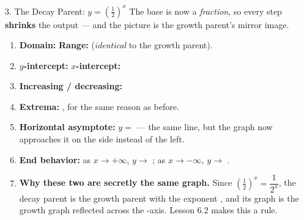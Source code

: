 \documentclass[10pt]{article}
\begin{document}
\begin{notesbox}{3. The Decay Parent: $y=\left(\frac12\right)^{x}$}
\vspace{2pt}
The base is now a \emph{fraction}, so every step \textbf{shrinks} the output --- and the picture is
the growth parent's mirror image.
\begin{enumerate}[leftmargin=1.7em, itemsep=3pt]
  \item \textbf{Domain:} \ans{$(-\infty,\infty)$} \quad \textbf{Range:}  \quad
        (\emph{identical} to the growth parent).
  \item \textbf{$y$-intercept:}  \quad \textbf{$x$-intercept:} 
  \item \textbf{Increasing / decreasing:} 
  \item \textbf{Extrema:} , for the same reason as before.
  \item \textbf{Horizontal asymptote:} $y=$  --- the same line, but the graph now
        approaches it on the  side instead of the left.
  \item \textbf{End behavior:} as $x\to+\infty$, $y\to$ ; \; as $x\to-\infty$,
        $y\to$ \ans{$+\infty$}.
  \item \textbf{Why these two are secretly the same graph.} Since
        $\left(\frac12\right)^{x}=\dfrac{1}{2^{x}}$, the decay parent is the growth parent with the
        exponent , and its graph is the growth graph reflected across the
        -axis. Lesson 6.2 makes this a rule.
\end{enumerate}
\end{notesbox}
\end{document}
